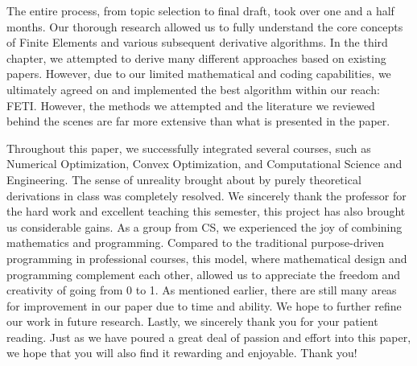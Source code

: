 \documentclass{article}
\begin{document}
The entire process, from topic selection to final draft, took over one and a half months. Our thorough research allowed us to fully understand the core concepts of Finite Elements and various subsequent derivative algorithms. In the third chapter, we attempted to derive many different approaches based on existing papers. However, due to our limited mathematical and coding capabilities, we ultimately agreed on and implemented the best algorithm within our reach: FETI. However, the methods we attempted and the literature we reviewed behind the scenes are far more extensive than what is presented in the paper.

Throughout this paper, we successfully integrated several courses, such as Numerical Optimization, Convex Optimization, and Computational Science and Engineering. The sense of unreality brought about by purely theoretical derivations in class was completely resolved. We sincerely thank the professor for the hard work and excellent teaching this semester, this project has also brought us considerable gains. As a group from CS, we experienced the joy of combining mathematics and programming. Compared to the traditional purpose-driven programming in professional courses, this model, where mathematical design and programming complement each other, allowed us to appreciate the freedom and creativity of going from 0 to 1. As mentioned earlier, there are still many areas for improvement in our paper due to time and ability. We hope to further refine our work in future research. Lastly, we sincerely thank you for your patient reading. Just as we have poured a great deal of passion and effort into this paper, we hope that you will also find it rewarding and enjoyable. Thank you!
\printbibliography
\end{document}
